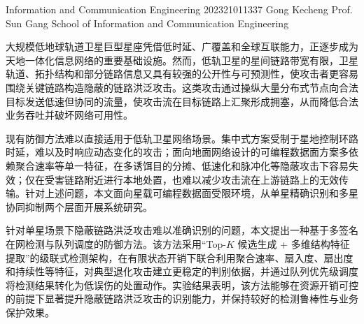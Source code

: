 \documentclass[print, master, vlined]{DissertUESTC}
\begin{document}
	
	\newcommand{\shad}[1]{\textcolor{DodgerBlue}{\ttfamily #1}}
	\newcommand{\shadcmd}[1]{\shad{$\backslash$#1}}

	

				
	\uestczhtitlepage

					{Information and Communication Engineering}
					{202321011337}
					{Gong Kecheng}
					{Prof. Sun Gang}
					{}
					{School of Information and Communication Engineering}

	\declaration{}{}{}

	
	
	\zhabstract
	
	大规模低地球轨道卫星巨型星座凭借低时延、广覆盖和全球互联能力，正逐步成为天地一体化信息网络的重要基础设施。然而，低轨卫星的星间链路带宽有限，卫星轨道、拓扑结构和部分链路信息又具有较强的公开性与可预测性，使攻击者更容易围绕关键链路构造隐蔽的链路洪泛攻击。这类攻击通过操纵大量分布式节点向合法目标发送低速但协同的流量，使攻击流在目标链路上汇聚形成拥塞，从而降低合法业务吞吐并破坏网络可用性。

	现有防御方法难以直接适用于低轨卫星网络场景。集中式方案受制于星地控制环路时延，难以及时响应动态变化的攻击；面向地面网络设计的可编程数据面方案多依赖聚合速率等单一特征，在多诱饵目的分摊、低速化和脉冲化等隐蔽攻击下容易失效；仅在受害链路附近进行本地处置，也难以减少攻击流在上游链路上的无效传输。针对上述问题，本文面向星载可编程数据面受限环境，从单星精确识别和多星协同抑制两个层面开展系统研究。

	针对单星场景下隐蔽链路洪泛攻击难以准确识别的问题，本文提出一种基于多签名在网检测与队列调度的防御方法。该方法采用“Top-$K$ 候选生成 + 多维结构特征提取”的级联式检测架构，在有限状态开销下联合利用聚合速率、扇入度、扇出度和持续性等特征，对典型退化攻击建立更稳定的判别依据，并通过队列优先级调度将检测结果转化为低误伤的处置动作。实验结果表明，该方法能够在资源开销可控的前提下显著提升隐蔽链路洪泛攻击的识别能力，并保持较好的检测鲁棒性与业务保护效果。
\end{document}
